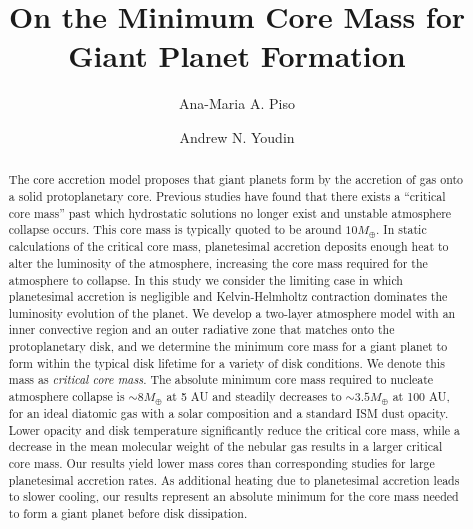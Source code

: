 \documentclass[apj, numberedappendix]{emulateapj}
\begin{document}



\title{On the Minimum Core Mass for Giant Planet Formation}

\author{Ana-Maria A. Piso}

\author{Andrew N. Youdin}


\begin{abstract}

The core accretion model proposes that giant planets form by the accretion of gas onto a solid protoplanetary core. Previous studies have found that there exists a ``critical core mass'' past which hydrostatic solutions no longer exist and unstable atmosphere collapse occurs. This core mass is typically quoted to be around $10 M_{\oplus}$. In static calculations of the critical core mass, planetesimal accretion deposits enough heat to alter the luminosity of the atmosphere, increasing the core mass required for the atmosphere to collapse. In this study we consider the limiting case in which planetesimal accretion is negligible and Kelvin-Helmholtz contraction dominates the luminosity evolution of the planet. We develop a two-layer atmosphere model with an inner convective region and an outer radiative zone that matches onto the protoplanetary disk, and we determine the minimum core mass for a giant planet to form within the typical disk lifetime for a variety of disk conditions. We denote this mass as  \textit{critical core mass}. The absolute minimum core mass required to nucleate atmosphere collapse is $\sim 8 M_{\oplus}$ at 5 AU and steadily decreases to $\sim 3.5 M_{\oplus}$ at 100 AU, for an ideal diatomic gas with a solar composition and a standard ISM dust opacity. Lower opacity and disk temperature significantly reduce the critical core mass, while a decrease in the mean molecular weight of the nebular gas results in a larger critical core mass. Our results yield lower mass cores than corresponding studies for large planetesimal accretion rates. As additional heating due to planetesimal accretion leads to slower cooling, our results represent an absolute minimum for the core mass needed to form a giant planet before disk dissipation.


\end{abstract}
\end{document}
